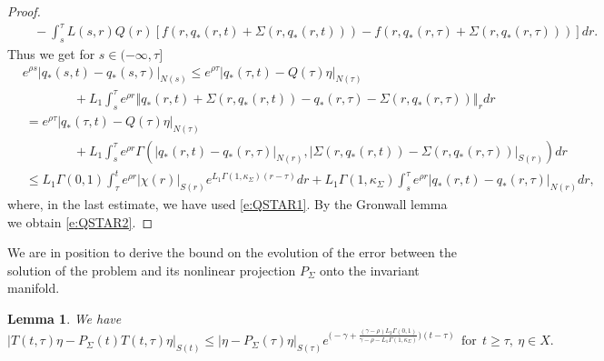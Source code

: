 \documentclass[a4paper,11pt,reqno]{amsart}
\theoremstyle{plain}
\newtheorem{lem}{Lemma}[section]
\theoremstyle{definition}
\numberwithin{equation}{section}
\newcommand{\norm}[1]{\left\Vert#1\right\Vert}
\renewcommand{\geq}{\geqslant}
\renewcommand{\leq}{\leqslant}
\begin{document}
\begin{proof}
\begin{align*}
& \ \ \ \ -\int_{s}^{\tau}L(s,r)Q(r)[f(r,q_{*}(r,t)+\Sigma(r,q_{*}(r,t)))-f(r,q_{*}(r,\tau)+\Sigma(r,q_{*}(r,\tau)))]dr.
\end{align*}
Thus we get for $s\in (-\infty,\tau]$
\begin{align*}
&	e^{\rho s}|q_{*}(s,t)-q_{*}(s,\tau)|_{N(s)}\leq e^{\rho\tau}|q_{*}(\tau,t)-Q(\tau)\eta|_{N(\tau)}\\
& \qquad\qquad  +L_1\int_{s}^{\tau}e^{\rho r}\norm{q_{*}(r,t)+\Sigma(r,q_{*}(r,t))-q_{*}(r,\tau)-\Sigma(r,q_{*}(r,\tau))}_{r}dr\\
& \  =e^{\rho\tau}|q_{*}(\tau,t)-Q(\tau)\eta|_{N(\tau)}\\
& \qquad \qquad +L_1\int_{s}^{\tau}e^{\rho r}\Gamma(|q_{*}(r,t)-q_{*}(r,\tau)|_{N(r)},|\Sigma(r,q_{*}(r,t))-\Sigma(r,q_{*}(r,\tau))|_{S(r)})dr\\
& \ \leq L_1\Gamma(0,1)\int_{\tau}^{t}e^{\rho r}|\chi(r)|_{S(r)}e^{L_1\Gamma(1,\kappa_\Sigma)(r-\tau)}dr+L_1\Gamma(1,\kappa_\Sigma)\int_{s}^{\tau}e^{\rho r}|q_{*}(r,t)-q_{*}(r,\tau)|_{N(r)}dr,
\end{align*}
where, in the last estimate, we have used \eqref{e:QSTAR1}. By the Gronwall lemma we obtain \eqref{e:QSTAR2}.
\end{proof}
We are in position to derive the bound on the evolution of the  error between the solution of the problem and its nonlinear projection $P_\Sigma$ onto the invariant manifold.
\begin{lem}\label{lem:error}
We have
\begin{equation}\label{e:ESTFORWARD}
|T(t,\tau)\eta-P_\Sigma(t)T(t,\tau)\eta|_{S(t)}\leq |\eta-P_\Sigma(\tau)\eta|_{S(\tau)}e^{\bigl(-\gamma+\frac{(\gamma-\rho)L_2\Gamma(0,1)}{\gamma-\rho-L_1\Gamma(1,\kappa_\Sigma)}\bigr)(t-\tau)}\ \ \text{for}\ \  t\geq\tau,\ \eta\in X.
\end{equation}
\end{lem}
\end{document}
